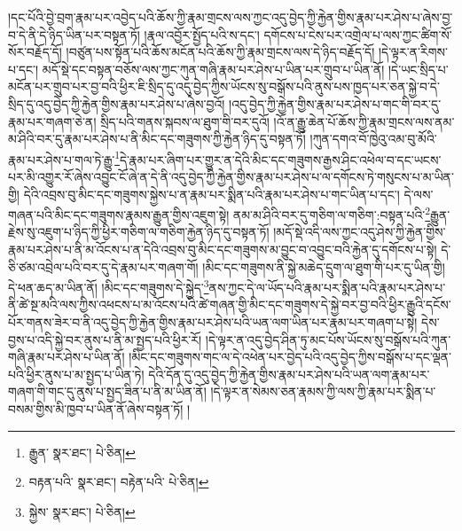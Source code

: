 །དང་པོའི་བྱེ་བྲག་རྣམ་པར་འབྱེད་པའི་ཆོས་ཀྱི་རྣམ་གྲངས་ལས་ཀྱང་འདུ་བྱེད་ཀྱི་རྐྱེན་གྱིས་རྣམ་པར་ཤེས་པ་ཞེས་བྱ་བ་དེ་ནི་དེ་ཉིད་ཡིན་པར་བསྟན་ཏོ། །རྣལ་འབྱོར་སྤྱོད་པའི་ས་དང་། དགོངས་པ་ངེས་པར་འགྲེལ་པ་ལས་ཀྱང་ཚིག་སོ་སོར་བརྗོད་དོ། །བཙུན་པས་སྟོན་པའི་ཆོས་མངོན་པའི་ཆོས་ཀྱི་རྣམ་གྲངས་ལས་དེ་ཉིད་བརྗོད་དོ། །དེ་ལྟར་ན་རིགས་པ་དང་། མདོ་སྡེ་དང་བསྟན་བཅོས་ལས་ཀྱང་ཀུན་གཞི་རྣམ་པར་ཤེས་པ་ཡིན་པར་གྲུབ་པ་ཡིན་ནོ། །དེ་ཡང་སྲིད་པ་མངོན་པར་གྲུབ་པར་བྱ་བའི་ཕྱིར་ཇི་སྲིད་དུ་འདུ་བྱེད་ཀྱིས་ཡོངས་སུ་བསྒོས་པའི་ནུས་པས་ཁྱད་པར་ཅན་སྐྱེ་བ་དེ་སྲིད་དུ་འདུ་བྱེད་ཀྱི་རྐྱེན་གྱིས་རྣམ་པར་ཤེས་པ་ཞེས་བྱའོ། །འདུ་བྱེད་ཀྱི་རྐྱེན་གྱིས་རྣམ་པར་ཤེས་པ་གང་གི་བར་དུ་རྣམ་པར་གཞག་ཅེ་ན། སྲིད་པའི་གནས་སྐབས་ལ་ཐུག་གི་བར་དུའོ། །འོ་ན་རྒྱུ་ཆེན་པོ་ཆོས་ཀྱི་རྣམ་གྲངས་ལས་ནམ་མ་ཤིའི་བར་དུ་རྣམ་པར་ཤེས་པ་ནི་མིང་དང་གཟུགས་ཀྱི་རྐྱེན་ཉིད་དུ་བསྟན་ཏོ། །ཀུན་དགའ་བོ་ཁྱེའུ་འམ་བུ་མོའི་རྣམ་པར་ཤེས་པ་གལ་ཏེ་རྒྱུ་\footnote{རྒྱུན་  སྣར་ཐང་།  པེ་ཅིན། }དེ་རྣམ་པར་ཞིག་པར་གྱུར་ན་དེའི་མིང་དང་གཟུགས་རྒྱས་ཤིང་འཕེལ་བ་དང་ཡངས་པར་མི་འགྱུར་རོ་ཞེས་འབྱུང་ངོ་ཞེ་ན་དེ་ནི་འདུ་བྱེད་ཀྱི་རྐྱེན་གྱིས་རྣམ་པར་ཤེས་པ་ལ་དགོངས་ཏེ་གསུངས་པ་མ་ཡིན་གྱི། དེའི་འབྲས་བུ་མིང་དང་གཟུགས་སྐྱེས་པ་ན་རྣམ་པར་སྨིན་པའི་རྣམ་པར་ཤེས་པ་གང་ཡིན་པ་དང་། དེ་ལས་གཞན་པའི་མིང་དང་གཟུགས་རྣམས་རྒྱུན་གྱིས་འཇུག་སྟེ། ནམ་མ་ཤིའི་བར་དུ་གཅིག་ལ་གཅིག་:བསྟན་པའི་\footnote{བརྟན་པའི་  སྣར་ཐང་། བརྟེན་པའི་  པེ་ཅིན། }རྒྱུན་རྗེས་སུ་འཇུག་པ་ཉིད་ཀྱི་ཕྱིར་གཅིག་ལ་གཅིག་རྐྱེན་ཉིད་དུ་བསྟན་ཏོ། །མདོ་སྡེ་འདི་ལས་ཀྱང་འདུ་ཤེས་ཀྱི་རྐྱེན་གྱིས་རྣམ་པར་ཤེས་པ་ནི་མ་འོངས་པ་ན་དེའི་འབྲས་བུ་མིང་དང་གཟུགས་མ་བྱུང་བ་འབྱུང་བའི་རྐྱེན་དུ་དགོངས་པ་སྟེ། དེ་ཅི་ཙམ་འབྲེལ་པའི་བར་དུ་དེ་རྣམ་པར་གཞག་གོ། །མིང་དང་གཟུགས་ནི་སྐྱེ་མཆེད་དྲུག་ལ་ཐུག་གི་པར་དུ་ཡིན་གྱི། དེ་ཕན་ཆད་མ་ཡིན་ནོ། །མིང་དང་གཟུགས་དེ་སྐྱེད་\footnote{སྐྱེས་  སྣར་ཐང་།  པེ་ཅིན། }ནས་ཀྱང་དེ་ལ་ཡོད་པའི་རྣམ་པར་སྨིན་པའི་རྣམ་པར་ཤེས་པ་ནི་ཚེ་སྔ་མའི་ལས་ཀྱིས་འཕངས་པ་མ་འོངས་པའི་ཚེ་གཞན་གྱི་མིང་དང་གཟུགས་དེ་སྐྱེ་བར་བྱ་བའི་ཕྱིར་རྒྱུའི་དངོས་པོར་གནས་ཟེར་བ་ནི་འདུ་བྱེད་ཀྱི་རྐྱེན་གྱིས་རྣམ་པར་ཤེས་པའི་ཡན་ལག་ཡིན་པར་རྣམ་པར་གཞག་པ་སྟེ། དེས་བྱས་པ་འདི་སྐྱེ་བར་ནུས་པ་ནི་མ་སྤྱད་པའི་ཕྱིར་རོ། །དེ་ལྟར་ན་འདུ་བྱེད་ཤིན་ཏུ་མང་པོས་ཡོངས་སུ་བསྒོས་པའི་ཀུན་གཞི་རྣམ་པར་ཤེས་པ་ཡིན་ནོ། །མིང་དང་གཟུགས་གང་ལ་དེ་འཕེན་པར་བྱེད་པའི་འདུ་བྱེད་ཀྱིས་བསྒོས་པ་དང་ལྡན་པའི་ཕྱིར་ནུས་པ་མ་སྤྱད་པ་ཡིན་ཏེ། དེའི་དོན་དུ་འདུ་བྱེད་ཀྱི་རྐྱེན་གྱིས་རྣམ་པར་ཤེས་པའི་ཡན་ལག་རྣམ་པར་གཞག་གི་གང་དུ་ནུས་པ་སྤྱད་ཟིན་པ་ནི་མ་ཡིན་ནོ། །དེ་ལྟར་ན་སེམས་ཅན་རྣམས་ཀྱི་ལས་ཀྱི་རྣམ་པར་སྨིན་པ་བསམ་གྱིས་མི་ཁྱབ་པ་ཡིན་ནོ་ཞེས་བསྟན་ཏོ། །
